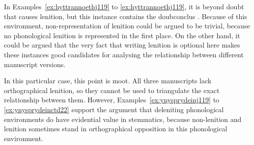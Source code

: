 


In Examples~\ref{ex:hyttrannoethj119} to \ref{ex:hyttrannoethj119}, it is beyond doubt that  causes lenition, but this instance contains the \gls{doubconclus} . Because of this environment, non-representation of lenition could be argued to be trivial, because  no phonological lenition is represented in the first place. On the other hand, it could be argued that the very fact that writing lenition is optional here makes these instances good candidates for analysing the relationship between different manuscript versions.
\begin{mwl}
\end{mwl}
In this particular case, this point is moot. All three manuscripts lack orthographical lenition, so they cannot be used to triangulate the exact relationship between them. However, Examples~\ref{ex:ynysprydeinj119} to \ref{ex:ynysprydeinctd22}  support the argument that deleniting phonological environments do have evidential value in stemmatics, because non-lenition and lenition sometimes stand in orthographical opposition in this phonological environment.



